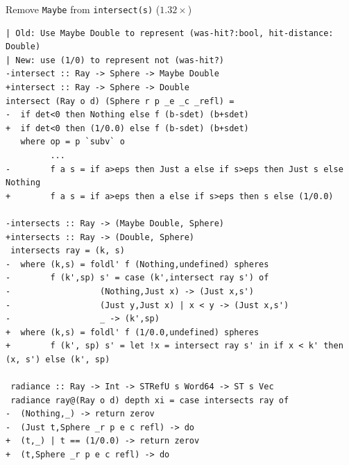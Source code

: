 \documentclass[8pt]{beamer}
\begin{document}
\begin{frame}[fragile]{Remove \texttt{Maybe} from \texttt{intersect(s)} ($1.32\times$)}
\begin{verbatim}
| Old: Use Maybe Double to represent (was-hit?:bool, hit-distance: Double)
| New: use (1/0) to represent not (was-hit?)
-intersect :: Ray -> Sphere -> Maybe Double
+intersect :: Ray -> Sphere -> Double
intersect (Ray o d) (Sphere r p _e _c _refl) =
-  if det<0 then Nothing else f (b-sdet) (b+sdet)
+  if det<0 then (1/0.0) else f (b-sdet) (b+sdet)
   where op = p `subv` o
         ...
-        f a s = if a>eps then Just a else if s>eps then Just s else Nothing
+        f a s = if a>eps then a else if s>eps then s else (1/0.0)

-intersects :: Ray -> (Maybe Double, Sphere)
+intersects :: Ray -> (Double, Sphere)
 intersects ray = (k, s)
-  where (k,s) = foldl' f (Nothing,undefined) spheres
-        f (k',sp) s' = case (k',intersect ray s') of
-                  (Nothing,Just x) -> (Just x,s')
-                  (Just y,Just x) | x < y -> (Just x,s')
-                  _ -> (k',sp)
+  where (k,s) = foldl' f (1/0.0,undefined) spheres
+        f (k', sp) s' = let !x = intersect ray s' in if x < k' then (x, s') else (k', sp)
 
 radiance :: Ray -> Int -> STRefU s Word64 -> ST s Vec
 radiance ray@(Ray o d) depth xi = case intersects ray of
-  (Nothing,_) -> return zerov
-  (Just t,Sphere _r p e c refl) -> do
+  (t,_) | t == (1/0.0) -> return zerov
+  (t,Sphere _r p e c refl) -> do
\end{verbatim}

\end{frame}
\end{document}
